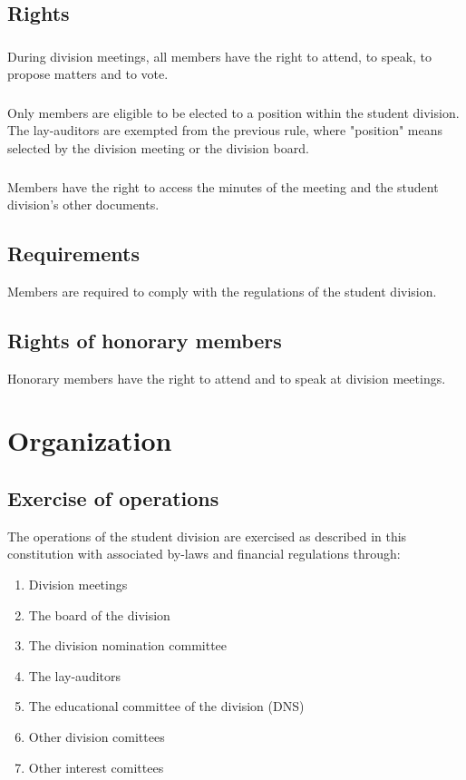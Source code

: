 \documentclass[a4paper]{dtek}
\begin{document}
\subsection{Rights}
\subsubsection{}
During division meetings, all members have the right to attend, to speak, to propose matters and to vote.

\subsubsection{}
Only members are eligible to be elected to a position within the student division. The lay-auditors are exempted from the previous rule, where "position" means selected by the division meeting or the division board.

\subsubsection{}
Members have the right to access the minutes of the meeting and the student division's other documents.


\subsection{Requirements}
Members are required to comply with the regulations of the student division. 

\subsection{Rights of honorary members}
Honorary members have the right to attend and to speak at division meetings.

\section{Organization}
\subsection{Exercise of operations}
The operations of the student division are exercised as described in this constitution with associated by-laws and financial regulations through: 

\begin{enumerate}
    \item Division meetings
    \item The board of the division 
    \item The division nomination committee 
    \item The lay-auditors
    \item The educational committee of the division (DNS)
    \item Other division comittees
    \item Other interest comittees
\end{enumerate}
\end{document}
